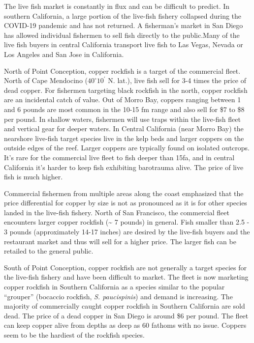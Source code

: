 \documentclass[11pt,
  english,
  letterpaper,
]{article}
\begin{document}
The live fish market is constantly in flux and can be difficult to predict. In southern California, a large portion of the live-fish fishery collapsed during the COVID-19 pandemic and has not returned. A fisherman's market in San Diego has allowed individual fishermen to sell fish directly to the public.Many of the live fish buyers in central California transport live fish to Las Vegas, Nevada or Los Angeles and San Jose in California.

North of Point Conception, copper rockfish is a target of the commercial fleet. North of Cape Mendocino ($40^\circ 10^\prime$ N. lat.), live fish sell for 3-4 times the price of dead copper. For fishermen targeting black rockfish in the north, copper rockfish are an incidental catch of value. Out of Morro Bay, coppers ranging between 1 and 6 pounds are most common in the 10-15 fm range and also sell for \$7 to \$8 per pound. In shallow waters, fishermen will use traps within the live-fish fleet and vertical gear for deeper waters. In Central California (near Morro Bay) the nearshore live-fish target species live in the kelp beds and larger coppers on the outside edges of the reef. Larger coppers are typically found on isolated outcrops. It's rare for the commercial live fleet to fish deeper than 15fa, and in central California it's harder to keep fish exhibiting barotrauma alive. The price of live fish is much higher.

Commercial fishermen from multiple areas along the coast emphasized that the price differential for copper by size is not as pronounced as it is for other species landed in the live-fish fishery. North of San Francisco, the commercial fleet encounters larger copper rockfish (\textasciitilde{} 7 pounds) in general. Fish smaller than 2.5 - 3 pounds (approximately 14-17 inches) are desired by the live-fish buyers and the restaurant market and thus will sell for a higher price. The larger fish can be retailed to the general public.

South of Point Conception, copper rockfish are not generally a target species for the live-fish fishery and have been difficult to market. The fleet is now marketing copper rockfish in Southern California as a species similar to the popular ``grouper'' (bocaccio rockfish, \emph{S. paucispinis}) and demand is increasing. The majority of commercially caught copper rockfish in Southern California are sold dead. The price of a dead copper in San Diego is around \$6 per pound. The fleet can keep copper alive from depths as deep as 60 fathoms with no issue. Coppers seem to be the hardiest of the rockfish species.
\end{document}
